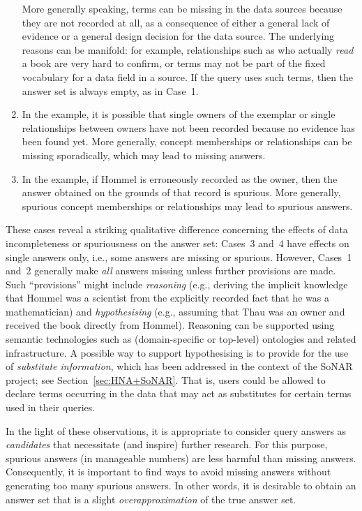 \begin{enumerate}
    More generally speaking, terms can be missing in the data sources
    because they are not recorded at all, as a consequence of either a general lack of evidence
    or a general design decision for the data source. The underlying reasons can be manifold:
    for example, relationships such as who actually \emph{read} a book are very hard to confirm,
    or terms may not be part of the fixed vocabulary for a data field in a source.
    If the query uses such terms, then the answer set is always empty, as in Case~1.
  \item    
    In the example, it is possible that single owners of the exemplar or single relationships between owners
    have not been recorded because no evidence has been found yet.
    More generally, concept memberships or relationships can be missing sporadically,
    which may lead to missing answers.
  \item
    In the example, if Hommel is erroneously recorded as the owner, then the answer obtained on the grounds
    of that record is spurious.
    More generally, spurious concept memberships or relationships may lead to spurious answers.
\end{enumerate}
%
These cases reveal a striking qualitative difference concerning the effects of data incompleteness or spuriousness
on the answer set: Cases~3 and~4 have effects on single answers only, i.e., some answers are missing or spurious.
However, Cases~1 and~2 generally make \emph{all} answers missing unless further provisions are made.
Such \enquote{provisions} might include \emph{reasoning}
(e.g., deriving the implicit knowledge that Hommel was a scientist from the explicitly recorded fact that he was a mathematician)
and \emph{hypothesising} (e.g., assuming that Thau was an owner and received the book directly from Hommel).
Reasoning can be supported using semantic technologies such as (domain-specific or top-level) ontologies and related infrastructure.
A possible way to support hypothesising is to provide for the use of \emph{substitute information},
which has been addressed in the context of the \gls{SoNAR} project; see Section~\ref{sec:HNA+SoNAR}.
That is, users could be allowed to declare terms occurring in the data that may act as substitutes for certain terms used in their queries.

In the light of these observations,
it is appropriate to consider
query answers as \emph{candidates} that necessitate (and inspire) further research.
For this purpose, spurious answers (in manageable numbers) are less harmful than missing answers.
Consequently, it is important to find ways to avoid missing answers without generating too many spurious answers.
In other words, it is desirable to obtain an answer set that is a slight \emph{overapproximation}
of the true answer set.

